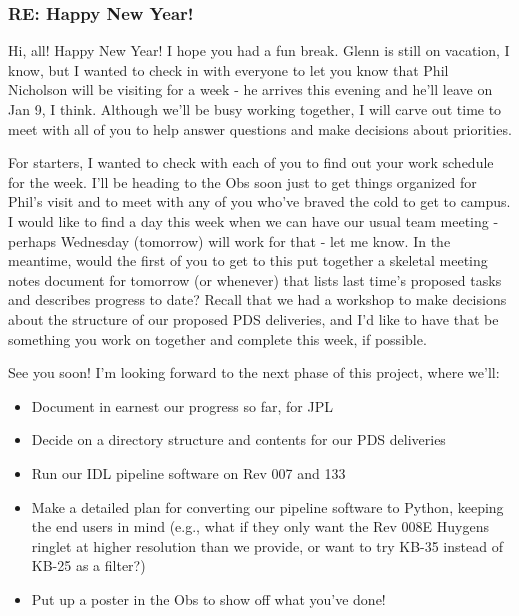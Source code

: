\documentclass[crop=false,class=book]{standalone}
\begin{document}
\subsubsection{\footnotesize RE: Happy New Year!}
Hi, all! Happy New Year! I hope you had a fun break. Glenn is still on vacation, I know, but I wanted to check in with everyone to let you know that Phil Nicholson will be visiting for a week - he arrives this evening and he'll leave on Jan 9, I think. Although we'll be busy working together, I will carve out time to meet with all of you to help answer questions and make decisions about priorities.\par
For starters, I wanted to check with each of you to find out your work schedule for the week. I'll be heading to the Obs soon just to get things organized for Phil's visit and to meet with any of you who've braved the cold to get to campus. I would like to find a day this week when we can have our usual team meeting - perhaps Wednesday (tomorrow) will work for that - let me know. 
In the meantime, would the first of you to get to this put together a skeletal meeting notes document for tomorrow (or whenever) that lists last time's proposed tasks and describes progress to date? Recall that we had a workshop to make decisions about the structure of our proposed PDS deliveries, and I'd like to have that be something you work on together and complete this week, if possible.\par
See you soon! I'm looking forward to the next phase of this project, where we'll:
\begin{itemize}
    \item Document in earnest our progress so far, for JPL
    \item Decide on a directory structure and contents for our PDS deliveries
    \item Run our IDL pipeline software on Rev 007 and 133
    \item Make a detailed plan for converting our pipeline software to Python, keeping the end users in mind (e.g., what if they only want the Rev 008E Huygens ringlet at higher resolution than we provide, or want to try KB-35 instead of KB-25 as a filter?)
    \item Put up a poster in the Obs to show off what you've done!
\end{itemize}
\end{document}
